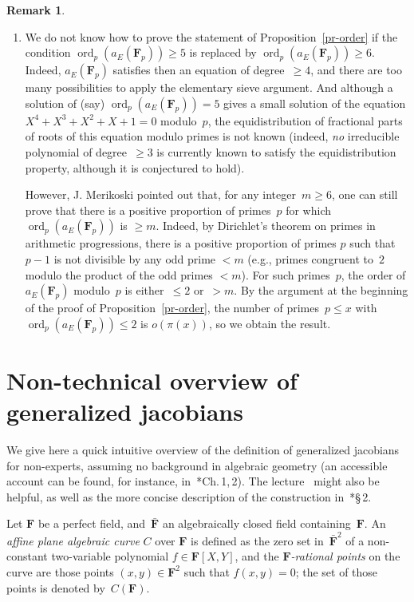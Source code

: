 \documentclass[12pt]{amsart}
\renewcommand{\leq}{\leqslant}
\renewcommand{\geq}{\geqslant}
\numberwithin{equation}{section}
\newcommand{\Ff}{\mathbf{F}}
\DeclareMathOperator{\ord}{ord}
\theoremstyle{plain}
\theoremstyle{remark}
\theoremstyle{definition}
\newtheorem{remark}[theorem]{Remark}
\renewcommand{\geq}{\geqslant}
\renewcommand{\leq}{\leqslant}
\begin{document}
\begin{remark}
\begin{enumerate}
  \item We do not know how to prove the statement of
  Proposition~\ref{pr-order} if the condition $\ord_p(a_E(\Ff_p))\geq 5$
  is replaced by $\ord_p(a_E(\Ff_p))\geq 6$. Indeed, $a_E(\Ff_p)$
  satisfies then an equation of degree~$\geq 4$, and there are too many
  possibilities to apply the elementary sieve argument. And although a
  solution of (say) $\ord_p(a_E(\Ff_p))=5$ gives a small solution of the
  equation $X^4+X^3+X^2+X+1=0$ modulo~$p$, the equidistribution of
  fractional parts of roots of this equation modulo primes is not known
  (indeed, \emph{no} irreducible polynomial of degree~$\geq 3$ is
  currently known to satisfy the equidistribution property, although it
  is conjectured to hold).

  However, J. Merikoski pointed out that, for any integer~$m\geq 6$,
  one can still prove that there is a positive proportion of
  primes~$p$ for which $\ord_p(a_E(\Ff_p))$ is $\geq m$. Indeed, by
  Dirichlet's theorem on primes in arithmetic progressions, there is a
  positive proportion of primes $p$ such that $p-1$ is not divisible
  by any odd prime $<m$ (e.g., primes congruent to~$2$ modulo the
  product of the odd primes $<m$). For such primes~$p$, the order of
  $a_E(\Ff_p)$ modulo~$p$ is either~$\leq 2$ or~$>m$. By the argument
  at the beginning of the proof of Proposition~\ref{pr-order}, the
  number of primes~$p\leq x$ with $\ord_p(a_E(\Ff_p))\leq 2$ is
  $o(\pi(x))$, so we obtain the result.  
  \end{enumerate}
\end{remark}

\appendix
\section{Non-technical overview of generalized jacobians}
\label{app-gj}

We give here a quick intuitive overview of the definition of generalized
jacobians for non\nobreakdash-experts, assuming no background in algebraic geometry
(an accessible account can be found, for instance,
in~\cite{silverman}*{Ch.\,1,\,2}). The lecture~\cite{renyi-talk} might
also be helpful, as well as the more concise description of the
construction in~\cite{ffk2}*{\S\,2}.

Let $\Ff$ be a perfect field,  and~$\bar{\Ff}$ an algebraically closed field
containing~$\Ff$. An \emph{affine plane algebraic curve} $C$ over $\Ff$ is defined as the zero set in~$\bar{\Ff}^2$ of a non-constant two-variable
polynomial $f\in \Ff[X,Y]$, and the \emph{$\Ff$-rational points} on the
curve are those points $(x,y) \in \Ff^2$ such that $f(x,y)=0$;
the set of those points is denoted by~$C(\Ff)$.
\end{document}
